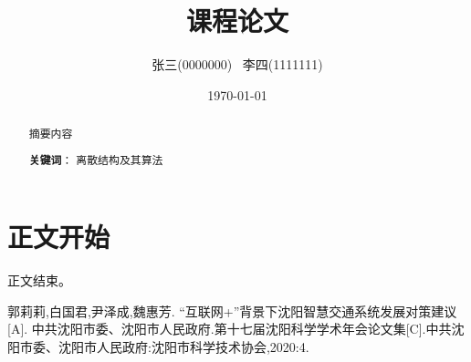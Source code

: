 \documentclass[UTF8]{article}
\title{课程论文}
\author{张三(0000000) \ 李四(1111111)}
\date{\today}
\begin{document}


\maketitle

\begin{abstract}
    摘要内容

    \textbf{关键词}： 离散结构及其算法
\end{abstract}

\section{正文开始}
正文结束。


\begin{thebibliography}{99}

    郭莉莉,白国君,尹泽成,魏惠芳. “互联网+”背景下沈阳智慧交通系统发展对策建议[A]. 中共沈阳市委、沈阳市人民政府.第十七届沈阳科学学术年会论文集[C].中共沈阳市委、沈阳市人民政府:沈阳市科学技术协会,2020:4.
\end{thebibliography}
\end{document}
